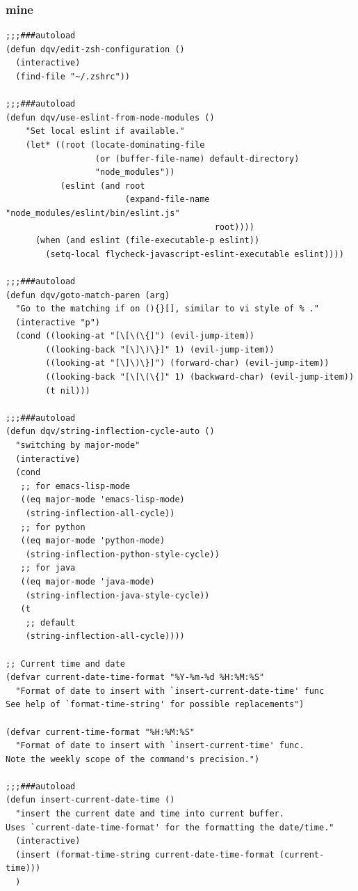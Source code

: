 \documentclass[11pt]{article}
\begin{document}
\subsubsection{mine}
\label{sec:orgf7491bf}
\begin{verbatim}
;;;###autoload
(defun dqv/edit-zsh-configuration ()
  (interactive)
  (find-file "~/.zshrc"))

;;;###autoload
(defun dqv/use-eslint-from-node-modules ()
    "Set local eslint if available."
    (let* ((root (locate-dominating-file
                  (or (buffer-file-name) default-directory)
                  "node_modules"))
           (eslint (and root
                        (expand-file-name "node_modules/eslint/bin/eslint.js"
                                          root))))
      (when (and eslint (file-executable-p eslint))
        (setq-local flycheck-javascript-eslint-executable eslint))))

;;;###autoload
(defun dqv/goto-match-paren (arg)
  "Go to the matching if on (){}[], similar to vi style of % ."
  (interactive "p")
  (cond ((looking-at "[\[\(\{]") (evil-jump-item))
        ((looking-back "[\]\)\}]" 1) (evil-jump-item))
        ((looking-at "[\]\)\}]") (forward-char) (evil-jump-item))
        ((looking-back "[\[\(\{]" 1) (backward-char) (evil-jump-item))
        (t nil)))

;;;###autoload
(defun dqv/string-inflection-cycle-auto ()
  "switching by major-mode"
  (interactive)
  (cond
   ;; for emacs-lisp-mode
   ((eq major-mode 'emacs-lisp-mode)
    (string-inflection-all-cycle))
   ;; for python
   ((eq major-mode 'python-mode)
    (string-inflection-python-style-cycle))
   ;; for java
   ((eq major-mode 'java-mode)
    (string-inflection-java-style-cycle))
   (t
    ;; default
    (string-inflection-all-cycle))))

;; Current time and date
(defvar current-date-time-format "%Y-%m-%d %H:%M:%S"
  "Format of date to insert with `insert-current-date-time' func
See help of `format-time-string' for possible replacements")

(defvar current-time-format "%H:%M:%S"
  "Format of date to insert with `insert-current-time' func.
Note the weekly scope of the command's precision.")

;;;###autoload
(defun insert-current-date-time ()
  "insert the current date and time into current buffer.
Uses `current-date-time-format' for the formatting the date/time."
  (interactive)
  (insert (format-time-string current-date-time-format (current-time)))
  )


\end{verbatim}
\end{document}
